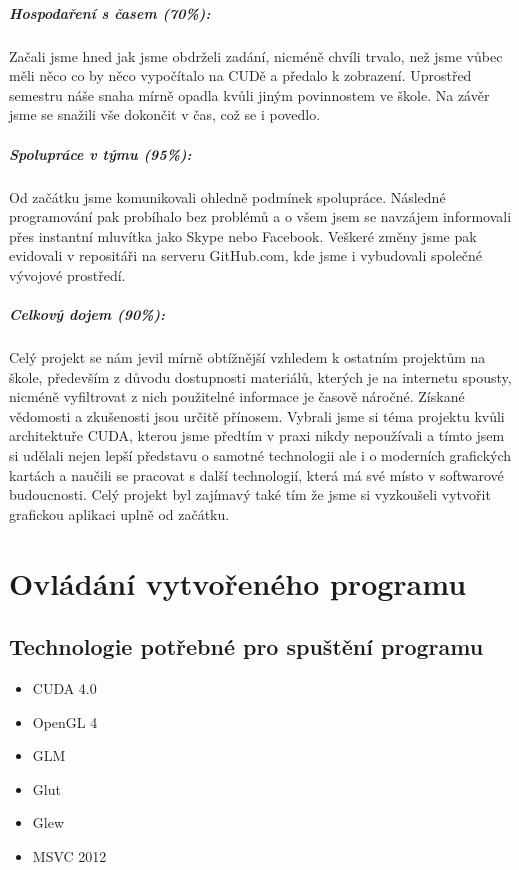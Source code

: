 \documentclass[12pt,a4paper,titlepage,final]{report}
\begin{document}
\paragraph{Hospodaření s časem (70\%):}
Začali jsme hned jak jsme obdrželi zadání, nicméně chvíli trvalo, než jsme vůbec měli něco co by něco vypočítalo na CUDě a předalo k zobrazení. Uprostřed semestru náše snaha mírně opadla kvůli jiným povinnostem ve škole. Na závěr jsme se snažili vše dokončit v čas, což se i povedlo.

\paragraph{Spolupráce v týmu (95\%):}
Od začátku jsme komunikovali ohledně podmínek spolupráce. Následné programování pak probíhalo bez problémů a o všem jsem se navzájem informovali přes instantní mluvítka jako Skype nebo Facebook. Veškeré změny jsme pak evidovali v repositáři na serveru GitHub.com, kde jsme i vybudovali společné vývojové prostředí.

\paragraph{Celkový dojem (90\%):} 
Celý projekt se nám jevil mírně obtížnější vzhledem k ostatním projektům na škole, především z důvodu dostupnosti materiálů, kterých je na internetu spousty, nicméně vyfiltrovat z nich použitelné informace je časově náročné. 
Získané vědomosti a zkušenosti jsou určitě přínosem. 
Vybrali jsme si téma projektu kvůli architektuře CUDA, kterou jsme předtím v praxi nikdy nepoužívali a tímto jsem si udělali nejen lepší představu o samotné technologii ale i o moderních grafických kartách a naučili se pracovat s další technologií, která má své místo v softwarové budoucnosti. Celý projekt byl zajímavý také tím že jsme si vyzkoušeli vytvořit grafickou aplikaci uplně od začátku.

\chapter{Ovládání vytvořeného programu}

\section{Technologie potřebné pro spuštění programu}
\begin{itemize}
	\item CUDA 4.0
	\item OpenGL 4
	\item GLM
	\item Glut
	\item Glew
	\item MSVC 2012
\end{itemize}
\end{document}
